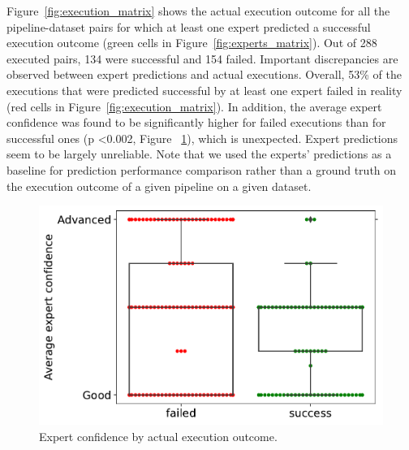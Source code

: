 \documentclass[conference]{IEEEtran}
\begin{document}
Figure~\ref{fig:execution_matrix} shows the actual execution outcome for
all the pipeline-dataset pairs for which at least one expert predicted a
successful execution outcome (green cells in
Figure~\ref{fig:experts_matrix}). Out of 288 executed pairs, 134   were
successful and 154 failed. 
Important discrepancies are observed between expert predictions and actual
executions. Overall, 53\% of the executions that were predicted successful by
at least one expert failed in reality (red cells in
Figure~\ref{fig:execution_matrix}). In addition, the average expert
confidence was found to be significantly higher for failed executions than
for successful ones (p \textless 0.002, Figure
~\ref{fig:confidence_swarm}), which is unexpected. Expert predictions
seem to be largely unreliable. Note that we used the experts' predictions as a baseline for prediction performance comparison rather than a ground truth on the execution outcome of a given pipeline on a given dataset. 

\begin{figure}
  \includegraphics[width=\columnwidth]{figures/Confidence Swarm Experts.pdf}
  \caption{Expert confidence by actual execution outcome.}
  \label{fig:confidence_swarm}
\end{figure}
\end{document}
